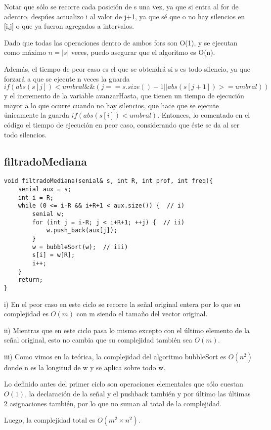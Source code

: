 \documentclass{article}
\begin{document}
Notar que sólo se recorre cada posición de s una vez, ya que si entra al for de adentro, despúes actualizo i
al valor de j+1, ya que sé que o no hay silencios en [i,j] o que ya fueron agregados a intervalos.

Dado que todas las operaciones dentro de ambos fors son O(1), y se ejecutan como máximo $n=|s|$ veces, puedo
asegurar que el algoritmo es O(n).

Además, el tiempo de peor caso es el que se obtendrá si s es todo silencio, ya que forzará a que se ejecute n
veces la guarda $if(abs(s[j]) < umbral \&\& (j == s.size()-1 || abs(s[j+1]) >= umbral))$ y el incremento de
la variable avanzarHasta, que tienen un tiempo de ejecución mayor a lo que ocurre cuando no hay silencios,
que hace que se ejecute únicamente la guarda $if(abs(s[i]) < umbral)$. Entonces, lo comentado en el código el tiempo de
ejecución en peor caso, considerando que éste se da al ser todo silencios.


\newpage
\subsection{filtradoMediana}
\begin{lstlisting}
void filtradoMediana(senial& s, int R, int prof, int freq){
    senial aux = s;
    int i = R;
    while (0 <= i-R && i+R+1 < aux.size()) {  // i)
        senial w;
        for (int j = i-R; j < i+R+1; ++j) {  // ii)
            w.push_back(aux[j]);
        }
        w = bubbleSort(w);  // iii)
        s[i] = w[R];
        i++;
    }
    return;
}
\end{lstlisting}

i) En el peor caso en este ciclo se recorre la señal original entera por lo que su complejidad es $O(m)$ con m siendo el tamaño del vector original.

ii) Mientras que en este ciclo pasa lo mismo excepto con el último elemento de la señal original, esto no cambia que su complejidad también sea $O(m)$.

iii) Como vimos en la teórica, la complejidad del algoritmo bubbleSort es $O(n^2)$ donde n es la longitud de w y se aplica sobre todo w.

Lo definido antes del primer ciclo son operaciones elementales que sólo cuestan $O(1)$, la declaración de la señal y el pushback también y por último las últimas 2 asignaciones también, por lo que no suman al total de la complejidad.

Luego, la complejidad total es $O(m^2 \times n^2)$.
\end{document}
